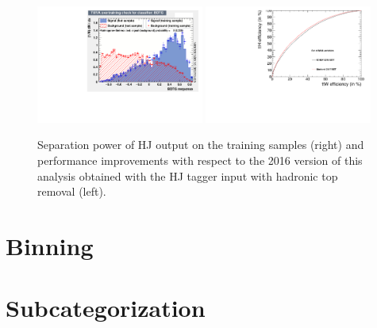 \begin{figure}[htp]
\centering
\includegraphics[width=0.49\textwidth]{ch9_figs/Jtagger_Ks.pdf}
\includegraphics[width=0.49\textwidth]{ch9_figs/Roc_Comparison_18Feb.pdf}
\caption[Performance improvement from the HJ tagger and hadronic top removal]{Separation power of HJ output on the training samples (right) and performance improvements with respect to the 2016 version of this analysis obtained with the HJ
tagger input with hadronic top removal (left).}
\label{fig:hj_tagger}
\end{figure}

\section{Binning}

\section{Subcategorization}


